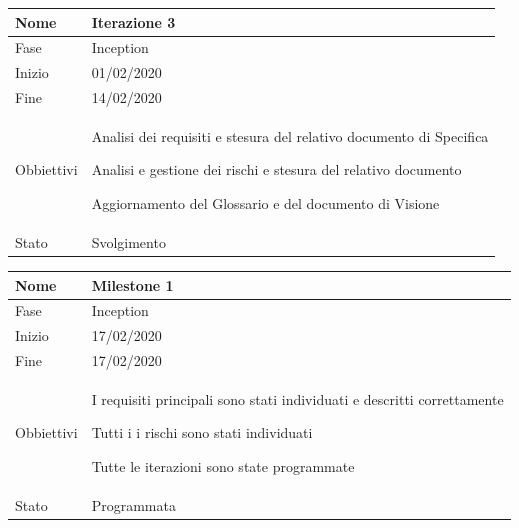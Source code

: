 \begin{center}
\begin{tabular}{ |p{}|p{}|  }
\hline
Nome & Iterazione 3 \\\hline
Fase & Inception \\\hline
Inizio & 01/02/2020 \\\hline
Fine &  14/02/2020 \\\hline
Obbiettivi & 
	\begin{compactitem}
		\item Analisi dei  requisiti e stesura del relativo documento di Specifica
		\item Analisi e gestione dei rischi e stesura del relativo documento
		\item Aggiornamento del Glossario e del documento di Visione
	\end{compactitem}\\\hline
Stato &  Svolgimento \\\hline
\end{tabular}
\label{table:3}\newline

\begin{tabular}{ |p{2cm}|p{10cm}|  }
\hline
Nome & Milestone 1\\\hline
Fase & Inception \\\hline
Inizio & 17/02/2020 \\\hline
Fine &  17/02/2020 \\\hline
Obbiettivi & 
	\begin{compactitem}
		\item I requisiti principali sono stati individuati e descritti correttamente
		\item Tutti i i rischi sono stati individuati
		\item Tutte le iterazioni sono state programmate
	\end{compactitem}\\\hline
Stato &  Programmata \\\hline
\end{tabular}
\label{table:milestone1}\newline


\end{center}

